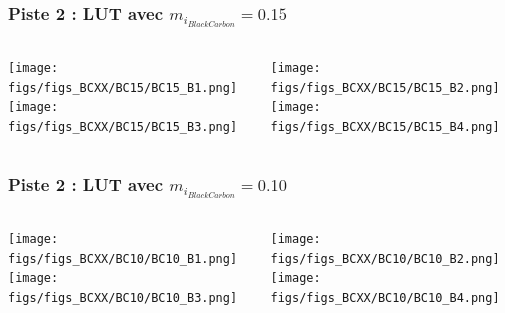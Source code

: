 \documentclass[8pt]{beamer}
\begin{document}
\begin{frame}
\frametitle{Piste 2 : LUT avec $m_{i_{Black Carbon}} = 0.15$}
	\begin{columns}
		\begin{column}{0.5\textwidth}
			\begin{center}
	     		\texttt{[image: figs/figs\_BCXX/BC15/BC15\_B1.png]}	
		     	\texttt{[image: figs/figs\_BCXX/BC15/BC15\_B3.png]}
		    \end{center}		
		    
		\end{column}
		\begin{column}{0.5\textwidth}
			\begin{center}
		     	\texttt{[image: figs/figs\_BCXX/BC15/BC15\_B2.png]}
		     	\texttt{[image: figs/figs\_BCXX/BC15/BC15\_B4.png]}
		    \end{center}				
		\end{column}
	\end{columns}
\end{frame}

\begin{frame}
\frametitle{Piste 2 : LUT avec $m_{i_{Black Carbon}} = 0.10$}
	\begin{columns}
		\begin{column}{0.5\textwidth}
			\begin{center}
	     		\texttt{[image: figs/figs\_BCXX/BC10/BC10\_B1.png]}	
		     	\texttt{[image: figs/figs\_BCXX/BC10/BC10\_B3.png]}
		    \end{center}		
		    
		\end{column}
		\begin{column}{0.5\textwidth}
			\begin{center}
		     	\texttt{[image: figs/figs\_BCXX/BC10/BC10\_B2.png]}
		     	\texttt{[image: figs/figs\_BCXX/BC10/BC10\_B4.png]}
		    \end{center}				
		\end{column}
	\end{columns}
\end{frame}

%


\end{document}
